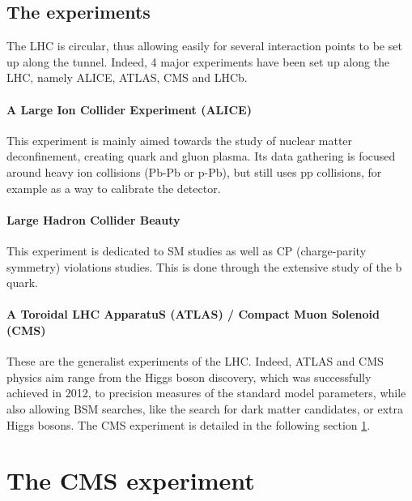 \subsection{The experiments}

The LHC is circular, thus allowing easily for several interaction points to be set up along the tunnel. Indeed, 4 major experiments have been set up along the LHC, namely ALICE, ATLAS, CMS and LHCb.

\paragraph{A Large Ion Collider Experiment (ALICE)} This experiment is mainly aimed towards the study of nuclear matter deconfinement, creating quark and gluon plasma. Its data gathering is focused around heavy ion collisions (Pb-Pb or p-Pb), but still uses pp collisions, for example as a way to calibrate the detector.

\paragraph{Large Hadron Collider Beauty} This experiment is dedicated to SM studies as well as CP (charge-parity symmetry) violations studies. This is done through the extensive study of the b quark.

\paragraph{A Toroidal LHC ApparatuS (ATLAS) / Compact Muon Solenoid (CMS)} These are the generalist experiments of the LHC. Indeed, ATLAS and CMS physics aim range from the Higgs boson discovery, which was successfully achieved in 2012, to precision measures of the standard model parameters, while also allowing BSM searches, like the search for dark matter candidates, or extra Higgs bosons. The CMS experiment is detailed in the following section \ref{sec:CMS}.


\section{The CMS experiment}
\label{sec:CMS}


